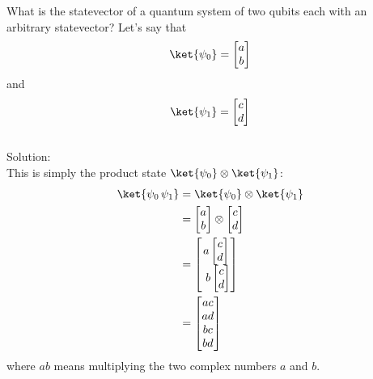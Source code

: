 \documentclass{article}
\newcommand{\soln}{{\\[1em] \hspace{-1em}\color{greentitle}\sffamily\large Solution: \\[0.5em]}}
\theoremstyle{definition}
\begin{document}
\begin{example}\label{ex:kzarb}
	What is the statevector of a quantum system of two qubits each with an arbitrary statevector?
	Let's say that
	\begin{equation}
		\ket{\psi_0} = \begin{bmatrix}a\\ b\end{bmatrix}
	\end{equation}
	and
	\begin{equation}
		\ket{\psi_1} = \begin{bmatrix}c\\ d\end{bmatrix}
	\end{equation}	
	\soln \textnormal{This is simply the product state $\ket{\psi_0} \otimes \ket{\psi_1}$:}
	\begin{align}
		\ket{\psi_0\,\psi_1} &= \ket{\psi_0} \otimes \ket{\psi_1}\\
		&= \begin{bmatrix}a\\ b\end{bmatrix} \otimes \begin{bmatrix}c\\ d\end{bmatrix}\\
		&= \begin{bmatrix}a\begin{bmatrix}c\\ d\end{bmatrix}\\\ b\begin{bmatrix}c\\ d\end{bmatrix}\end{bmatrix}\\
		&= \begin{bmatrix}ac\\ ad\\ bc\\ bd\end{bmatrix}
	\end{align}
	where $ab$ means multiplying the two complex numbers $a$ and $b$.
\end{example}
\end{document}
